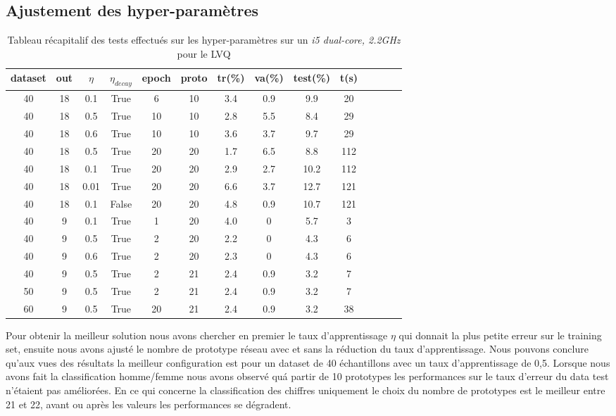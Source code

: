 \documentclass[11pt]{article}
\begin{document}
\newpage
\subsection{Ajustement des hyper-param\`etres}
\begin{table}[h]
	\centering
	\begin{tabular}{|c|c|c|c|c|c|c|c|c|c|c|c|c|c|}
		\hline
		dataset & out  & $\eta$ & $\eta_{decay}$ & epoch  & proto  & tr(\%) & va(\%) & test(\%) & t(s)\\
		\hline		
		40	& 18 & 0.1 & True & 6 & 10 & 3.4 & 0.9 & 9.9 & 20\\
		\hline
		\rowcolor{green}		
		40	& 18 & 0.5 & True & 10 & 10 & 2.8 & 5.5 & 8.4 & 29\\
		\hline		
		40	& 18 & 0.6 & True & 10 & 10 & 3.6 & 3.7 & 9.7 & 29\\
		\hline		
		40	& 18 & 0.5 & True & 20 & 20 & 1.7 & 6.5 & 8.8 & 112\\
		\hline		
		40	& 18 & 0.1 & True & 20 & 20 & 2.9 & 2.7 & 10.2 & 112\\
		\hline		
		40	& 18 & 0.01 & True & 20 & 20 & 6.6 & 3.7 & 12.7 & 121\\
		\hline		
		40	& 18 & 0.1 & False & 20 & 20 & 4.8 & 0.9 & 10.7 & 121\\
		\hline		
		40	& 9 & 0.1 & True & 1 & 20 & 4.0 & 0 & 5.7 & 3\\
		\hline		
		40	& 9 & 0.5 & True & 2 & 20 & 2.2 & 0 & 4.3 & 6\\
		\hline
		40	& 9 & 0.6 & True & 2 & 20 & 2.3 & 0 & 4.3 & 6\\
		\hline
		\rowcolor{green}
		40	& 9 & 0.5 & True & 2 & 21 & 2.4 & 0.9 & 3.2 & 7\\
		\hline
		50  & 9 & 0.5 & True & 2 & 21 & 2.4 & 0.9 & 3.2 & 7\\
		\hline
		60  & 9 & 0.5 & True & 20 & 21 & 2.4 & 0.9 & 3.2 & 38\\
		\hline
\end{tabular}
  \caption{Tableau r\'ecapitalif des tests effectu\'es sur les
	hyper-param\`etres sur un {\em i5 dual-core, 2.2GHz} pour le LVQ }
\end{table}


Pour obtenir la meilleur solution nous avons chercher en premier le
taux d'apprentissage $\eta$  qui donnait la plus petite erreur sur le training set,
ensuite nous avons ajust\'e le nombre de prototype r\'eseau avec et sans la r\'eduction du taux d'apprentissage. Nous pouvons conclure qu'aux vues des r\'esultats la meilleur configuration est pour un dataset de 40 \'echantillons avec un taux d'apprentissage de 0,5. Lorsque nous avons fait la classification homme/femme nous avons observ\'e qu\'a partir de 10 prototypes les performances sur le taux d'erreur du data test n'\'etaient pas am\'elior\'ees. En ce qui concerne la classification des chiffres uniquement le choix  du nombre de prototypes est le meilleur entre 21 et 22, avant ou apr\`es les valeurs les performances se d\'egradent.       
\newpage
\end{document}
